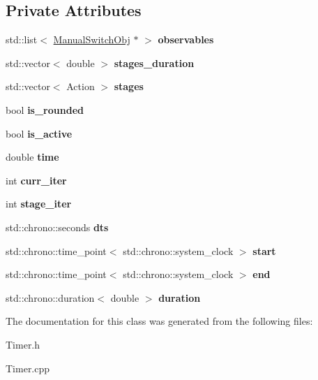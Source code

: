 \subsection*{Private Attributes}
\begin{DoxyCompactItemize}
\item 
\mbox{\label{class_timer_acf215281063a8be431d810725a804224}} 
std\+::list$<$ \hyperlink{class_manual_switch_obj}{Manual\+Switch\+Obj} $\ast$ $>$ {\bfseries observables}
\item 
\mbox{\label{class_timer_a77e0f14caf59087a0afa9e466b3b8c4b}} 
std\+::vector$<$ double $>$ {\bfseries stages\+\_\+duration}
\item 
\mbox{\label{class_timer_a8f8c7d41223e9976d4588ef212286fb5}} 
std\+::vector$<$ Action $>$ {\bfseries stages}
\item 
\mbox{\label{class_timer_ac397f8917b155e12401dd9ab793c91d9}} 
bool {\bfseries is\+\_\+rounded}
\item 
\mbox{\label{class_timer_a6f1066d49764f5fc746f5fd669d95a9f}} 
bool {\bfseries is\+\_\+active}
\item 
\mbox{\label{class_timer_aa410e9f94d1cdb79090fcf159f8f4d8c}} 
double {\bfseries time}
\item 
\mbox{\label{class_timer_ae5b386341474f4cb8f11227e884250ab}} 
int {\bfseries curr\+\_\+iter}
\item 
\mbox{\label{class_timer_a34caee928e5a02b075496a74329abaeb}} 
int {\bfseries stage\+\_\+iter}
\item 
\mbox{\label{class_timer_a196651dd936adea933d014145a9ae38e}} 
std\+::chrono\+::seconds {\bfseries dts}
\item 
\mbox{\label{class_timer_a1f7d523a49922d1d2bbfa2b49ebd4b38}} 
std\+::chrono\+::time\+\_\+point$<$ std\+::chrono\+::system\+\_\+clock $>$ {\bfseries start}
\item 
\mbox{\label{class_timer_abb300a4bdf620b8711d1e90980096291}} 
std\+::chrono\+::time\+\_\+point$<$ std\+::chrono\+::system\+\_\+clock $>$ {\bfseries end}
\item 
\mbox{\label{class_timer_a331df3365dd6a3a6eb3382a9bb36e3cc}} 
std\+::chrono\+::duration$<$ double $>$ {\bfseries duration}
\end{DoxyCompactItemize}


The documentation for this class was generated from the following files\+:\begin{DoxyCompactItemize}
\item 
Timer.\+h\item 
Timer.\+cpp\end{DoxyCompactItemize}
